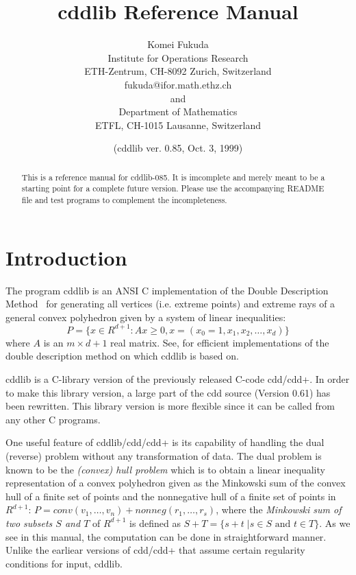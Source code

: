 \documentclass[11pt]{article}
\newcommand {\0} {{\bf 0}}
\begin{document}
\title{cddlib Reference Manual}
\author{
Komei Fukuda \\
Institute for Operations Research\\
ETH-Zentrum, CH-8092 Zurich, Switzerland\\
fukuda@ifor.math.ethz.ch \\and\\
Department of Mathematics\\
ETFL, CH-1015 Lausanne, Switzerland}
\date{ (cddlib ver. 0.85,  Oct. 3, 1999)}

\maketitle
\begin{abstract}
This is a reference manual for cddlib-085.  
It is imcomplete and merely meant to be a starting point 
for a complete future version.  Please use the accompanying README file and test programs to complement the incompleteness.
\end{abstract}

\section{Introduction} \label{INTRODUCTION}

The program  cddlib  is an ANSI C implementation of 
the Double Description Method~\cite{mrtt-ddm-53}
for generating all vertices (i.e. extreme points)
and extreme rays of a general 
convex polyhedron given by a system of linear inequalities:
\[
   P = \{ x  \in R^{d+1}:  A  x  \ge 0, x=(x_0=1, x_1, x_2, \ldots, x_d) \}
\]
where $A$ is an $m \times d+1$ real matrix.   See, \cite{fp-ddmr-96} for
efficient implementations of the double description
method on which cddlib is based on.

cddlib is a C-library version of the previously released C-code cdd/cdd+.
In order to make this library version, a large part of the cdd source
(Version 0.61) has been rewritten.
This library version is more flexible since it can be called from any
other C programs.

One useful feature of  cddlib/cdd/cdd+ is its capability
of handling the dual (reverse)  problem without any transformation
of data.  The dual problem is known to be the 
{\em (convex) hull problem\/} which
is to obtain a linear inequality representation
of a convex polyhedron given as the Minkowski sum of 
the convex hull of a finite set of points and the nonnegative
hull of a finite set of points in $R^{d+1}$: 
$P = conv(v_1,\ldots,v_n) +  nonneg(r_1,\ldots,r_s)$, where
 the {\em Minkowski sum of two subsets $S$ and $T$} of $R^{d+1}$ is defined
as $S + T = \{ s + t \; |  s \in S \mbox{ and } t \in T \}$.
As we see in this manual, the computation can be done
in straightforward manner.  Unlike the earliear versions of
cdd/cdd+ that assume certain regularity conditions for input, cddlib.
\end{document}
